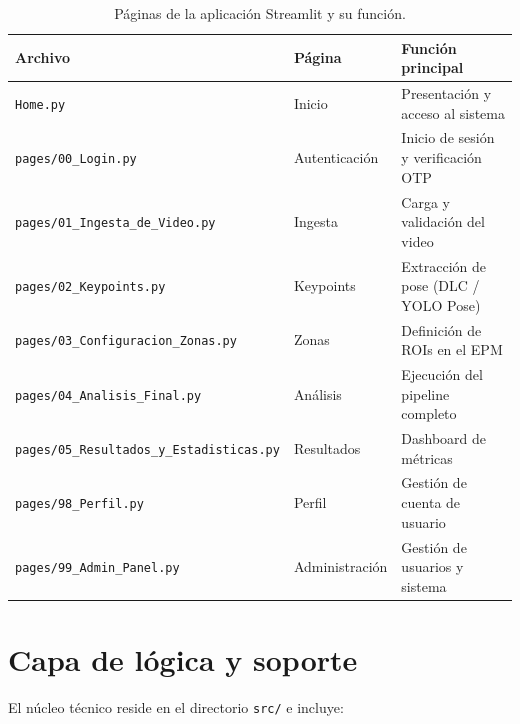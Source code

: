 \documentclass[12pt]{report}
\begin{document}
\begin{table}[H]
    \centering
    \begin{tabular}{@{}lll@{}}
        \toprule
        \textbf{Archivo} & \textbf{Página} & \textbf{Función principal} \\
        \midrule
        \texttt{Home.py}                     & Inicio            & Presentación y acceso al sistema \\
        \texttt{pages/00\_Login.py}           & Autenticación     & Inicio de sesión y verificación OTP \\
        \texttt{pages/01\_Ingesta\_de\_Video.py} & Ingesta        & Carga y validación del video \\
        \texttt{pages/02\_Keypoints.py}       & Keypoints         & Extracción de pose (DLC / YOLO Pose) \\
        \texttt{pages/03\_Configuracion\_Zonas.py} & Zonas       & Definición de ROIs en el EPM \\
        \texttt{pages/04\_Analisis\_Final.py}  & Análisis          & Ejecución del pipeline completo \\
        \texttt{pages/05\_Resultados\_y\_Estadisticas.py} & Resultados & Dashboard de métricas \\
        \texttt{pages/98\_Perfil.py}           & Perfil            & Gestión de cuenta de usuario \\
        \texttt{pages/99\_Admin\_Panel.py}     & Administración    & Gestión de usuarios y sistema \\
        \bottomrule
    \end{tabular}
    \caption{Páginas de la aplicación Streamlit y su función.}
    \label{tab:paginas}
\end{table}

\section{Capa de lógica y soporte}

El núcleo técnico reside en el directorio \texttt{src/} e incluye:
\end{document}
